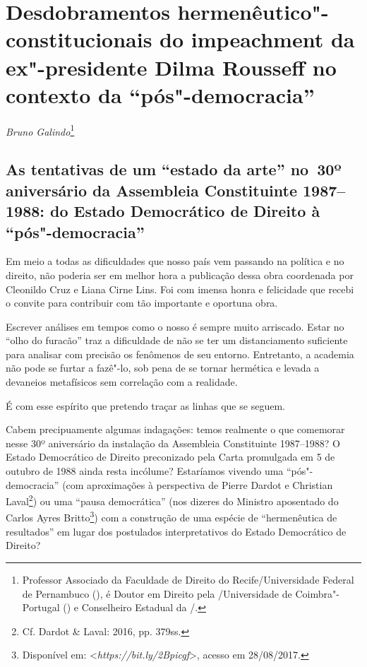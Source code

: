 \chapter*{Desdobramentos hermenêutico"-constitucionais do
impeachment da ex"-presidente Dilma Rousseff no contexto da
``pós"-democracia''}


\begin{flushright}
\emph{Bruno Galindo}\footnote{Professor Associado da Faculdade de Direito do Recife/Universidade
Federal de Pernambuco (), é
Doutor em Direito pela /Universidade de Coimbra"-Portugal
() e Conselheiro Estadual da /.}
\end{flushright}


 \section{As tentativas de um ``estado da arte'' no~30º aniversário da
  Assembleia Constituinte 1987--1988: do Estado Democrático de Direito à
  ``pós"-democracia''}


Em meio a todas as dificuldades que nosso país vem passando na política
e no direito, não poderia ser em melhor hora a publicação dessa obra
coordenada por Cleonildo Cruz e Liana Cirne Lins. Foi com imensa honra e
felicidade que recebi o convite para contribuir com tão importante e
oportuna obra.

Escrever análises em tempos como o nosso é sempre muito arriscado. Estar
no ``olho do furacão'' traz a dificuldade de não se ter um
distanciamento suficiente para analisar com precisão os fenômenos de seu
entorno. Entretanto, a academia não pode se furtar a fazê"-lo, sob pena
de se tornar hermética e levada a devaneios metafísicos sem correlação
com a realidade.

É com esse espírito que pretendo traçar as linhas que se seguem.

Cabem precipuamente algumas indagações: temos realmente o que comemorar
nesse 30º aniversário da instalação da Assembleia Constituinte
1987--1988? O Estado Democrático de Direito preconizado pela Carta
promulgada em 5 de outubro de 1988 ainda resta incólume? Estaríamos
vivendo uma ``pós"-democracia'' (com aproximações à perspectiva de Pierre
Dardot e Christian Laval\footnote{Cf. Dardot \& Laval: 2016, pp. 379ss.}) ou
uma ``pausa democrática'' (nos dizeres do Ministro aposentado do 
Carlos Ayres Britto\footnote{Disponível em: \textless{}\emph{https://bit.ly/2Bpicgf}\textgreater{},
  acesso em 28/08/2017.}) com a construção de uma espécie de
``hermenêutica de resultados'' em lugar dos postulados interpretativos
do Estado Democrático de Direito?

